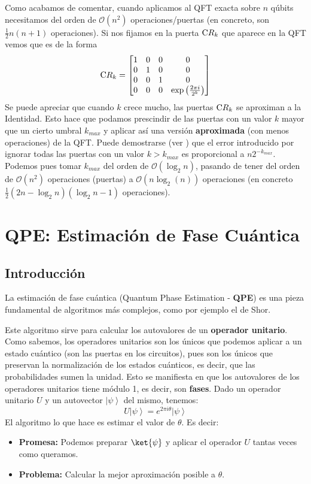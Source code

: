 \documentclass[a4paper,11pt]{book} %
\numberwithin{equation}{chapter}
\newcommand{\cg}[1]{{\rm C}#1}
\begin{document}
Como acabamos de comentar, cuando aplicamos al QFT exacta sobre $n$ qúbits necesitamos del orden de $\mathcal{O} (n^2)$ operaciones/puertas (en concreto, son $\frac{1}{2} n(n+1)$ operaciones). Si nos fijamos en la puerta $\cg{R_k}$ que aparece en la QFT vemos que es de la forma
	\begin{equation}
	\cg{R_k} = \left[ \begin{matrix}
	1 & 0 & 0 & 0 \\
	0 & 1 & 0 & 0 \\
	0 & 0 & 1 & 0 \\
	0 & 0 & 0 & \exp \left( \frac{2 \pi i}{2^k} \right)
	\end{matrix} \right]
	\end{equation}
Se puede apreciar que cuando $k$ crece mucho, las puertas $\cg{R_k}$ se aproximan a la Identidad. Esto hace que podamos prescindir de las puertas con un valor $k$ mayor que un cierto umbral $k_{max}$ y aplicar así una versión \textbf{aproximada} (con menos operaciones) de la QFT. Puede demostrarse (ver \cite{bib_QFT-aprox}) que el error introducido por ignorar todas las puertas con un valor $k > k_{max}$ es proporcional a $n 2^{-k_{max}}$. Podemos pues tomar $k_{max}$ del orden de $\mathcal{O} (\log_2 n)$, pasando de tener del orden de $\mathcal{O} (n^2)$ operaciones (puertas) a $\mathcal{O} (n \log_2(n))$ operaciones (en concreto $\frac{1}{2} (2n-\log_2n)(\log_2n-1)$ operaciones).


\chapter{QPE: Estimación de Fase Cuántica} \label{chapter_QPE}


\section{Introducción}

La estimación de fase cuántica (Quantum Phase Estimation - \textbf{QPE}) es una pieza fundamental de algoritmos más complejos, como por ejemplo el de Shor. 

Este algoritmo sirve para calcular los autovalores de un \textbf{operador unitario}. Como sabemos, los operadores unitarios son los únicos que podemos aplicar a un estado cuántico (son las puertas en los circuitos), pues son los únicos que preservan la normalización de los estados cuánticos, es decir, que las probabilidades sumen la unidad. Esto se manifiesta en que los autovalores de los operadores unitarios tiene módulo 1, es decir, son \textbf{fases}. Dado un operador unitario $U$ y un autovector $\left| \psi \right\rangle$ del mismo, tenemos:
$$
U \left| \psi \right\rangle = e^{2 \pi i \theta} \left| \psi \right\rangle
$$
El algoritmo lo que hace es estimar el valor de $\theta$. Es decir:
\begin{itemize}
	\item \textbf{Promesa:} Podemos preparar $\ket{\psi}$ y aplicar el operador $U$ tantas veces como queramos.
	\item \textbf{Problema:} Calcular la mejor aproximación posible a $\theta$.
\end{itemize}
\end{document}
